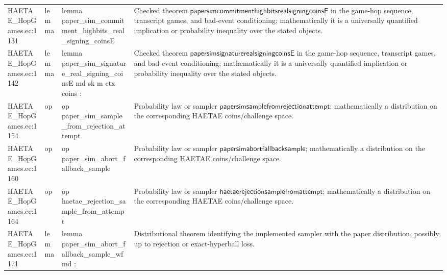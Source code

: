 \documentclass[10pt]{article}
\begin{document}
\begin{longtable}{L{0.11\textwidth}L{0.055\textwidth}L{0.385\textwidth}L{0.41\textwidth}}
HAETAE\_\allowbreak{}HopGames.\allowbreak{}ec:\allowbreak{}1131 & lemma & {\ttfamily\scriptsize lemma paper\_\allowbreak{}sim\_\allowbreak{}commitment\_\allowbreak{}highbits\_\allowbreak{}real\_\allowbreak{}signing\_\allowbreak{}coinsE} & Checked theorem $\mathsf{papersimcommitmenthighbitsrealsigningcoinsE}$ in the game-hop sequence, transcript games, and bad-event conditioning; mathematically it is a universally quantified implication or probability inequality over the stated objects. \\
HAETAE\_\allowbreak{}HopGames.\allowbreak{}ec:\allowbreak{}1142 & lemma & {\ttfamily\scriptsize lemma paper\_\allowbreak{}sim\_\allowbreak{}signature\_\allowbreak{}real\_\allowbreak{}signing\_\allowbreak{}coinsE md sk m ctx coins :} & Checked theorem $\mathsf{papersimsignaturerealsigningcoinsE}$ in the game-hop sequence, transcript games, and bad-event conditioning; mathematically it is a universally quantified implication or probability inequality over the stated objects. \\
HAETAE\_\allowbreak{}HopGames.\allowbreak{}ec:\allowbreak{}1154 & op & {\ttfamily\scriptsize op paper\_\allowbreak{}sim\_\allowbreak{}sample\_\allowbreak{}from\_\allowbreak{}rejection\_\allowbreak{}attempt} & Probability law or sampler $\mathsf{papersimsamplefromrejectionattempt}$; mathematically a distribution on the corresponding HAETAE coins/challenge space. \\
HAETAE\_\allowbreak{}HopGames.\allowbreak{}ec:\allowbreak{}1160 & op & {\ttfamily\scriptsize op paper\_\allowbreak{}sim\_\allowbreak{}abort\_\allowbreak{}fallback\_\allowbreak{}sample} & Probability law or sampler $\mathsf{papersimabortfallbacksample}$; mathematically a distribution on the corresponding HAETAE coins/challenge space. \\
HAETAE\_\allowbreak{}HopGames.\allowbreak{}ec:\allowbreak{}1164 & op & {\ttfamily\scriptsize op haetae\_\allowbreak{}rejection\_\allowbreak{}sample\_\allowbreak{}from\_\allowbreak{}attempt} & Probability law or sampler $\mathsf{haetaerejectionsamplefromattempt}$; mathematically a distribution on the corresponding HAETAE coins/challenge space. \\
HAETAE\_\allowbreak{}HopGames.\allowbreak{}ec:\allowbreak{}1171 & lemma & {\ttfamily\scriptsize lemma paper\_\allowbreak{}sim\_\allowbreak{}abort\_\allowbreak{}fallback\_\allowbreak{}sample\_\allowbreak{}wf md :} & Distributional theorem identifying the implemented sampler with the paper distribution, possibly up to rejection or exact-hyperball loss. \\

\end{longtable}
\end{document}
